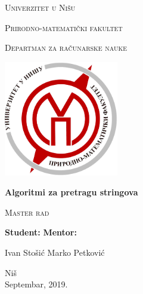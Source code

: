 \begin{titlepage}

\begin{center}
{\large \textsc{Univerzitet u Ni\v su}}
\end{center}
\begin{center}
{\large \textsc{Prirodno-matemati\v cki fakultet}}
\end{center}
\begin{center}
{\large \textsc{Departman za ra\v cunarske nauke}}
\end{center}

\vspace{1.6cm}

\begin{center}
\includegraphics[width=5cm]{img/logo.png}
\end{center}

\vspace{1.6cm}

\begin{center}
{\huge \textbf{Algoritmi za pretragu stringova}}
\end{center}
\begin{center}
{\large \textsc{Master rad}}
\end{center}
\vspace{3cm}


\large \textbf{Student:} \hfill \textbf{Mentor:}

\large Ivan Sto\v si\' c \hfill Marko Petkovi\' c

\vspace{1cm}
\begin{center}{Ni\v s\\
Septembar, 2019.}\end{center}
\end{titlepage}